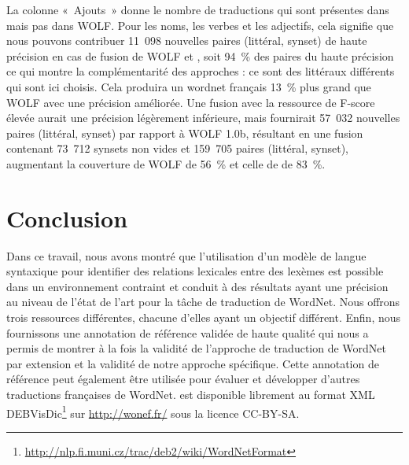 La colonne «~Ajouts~» donne le nombre de traductions qui sont présentes dans \newjaws{} mais pas dans WOLF. Pour les noms, les verbes et les adjectifs, cela signifie que nous pouvons contribuer 11~098 nouvelles paires (littéral, synset) de haute précision en cas de fusion de WOLF et \newjaws{}, soit 94~\% des paires du \newjaws{} haute précision ce qui montre la complémentarité des approches : ce sont des littéraux différents qui sont ici choisis. Cela produira un wordnet français 13~\% plus grand que WOLF avec une précision améliorée. Une fusion avec la ressource de F-score élevée aurait une précision légèrement inférieure, mais fournirait 57~032 nouvelles paires (littéral, synset) par rapport à WOLF 1.0b, résultant en une fusion contenant 73~712 synsets non vides et 159~705 paires (littéral, synset), augmentant la couverture de WOLF de 56~\% et celle de \newjaws{} de 83~\%.


\section*{Conclusion}

Dans ce travail, nous avons montré que l'utilisation d'un modèle de langue syntaxique pour identifier des relations lexicales entre des lexèmes est possible dans un environnement contraint et conduit à des résultats ayant une précision au niveau de l'état de l'art pour la tâche de traduction de WordNet. Nous offrons trois ressources différentes, chacune d'elles ayant un objectif différent. Enfin, nous fournissons une annotation de référence validée de haute qualité qui nous a permis de montrer à la fois la validité de l'approche de traduction de WordNet par extension et la validité de notre approche spécifique. Cette annotation de référence peut également être utilisée pour évaluer et développer d'autres traductions françaises de WordNet. \newjaws{} est disponible librement au format XML DEBVisDic\footnote{\url{http://nlp.fi.muni.cz/trac/deb2/wiki/WordNetFormat}} sur \url{http://wonef.fr/} sous la licence CC-BY-SA.

